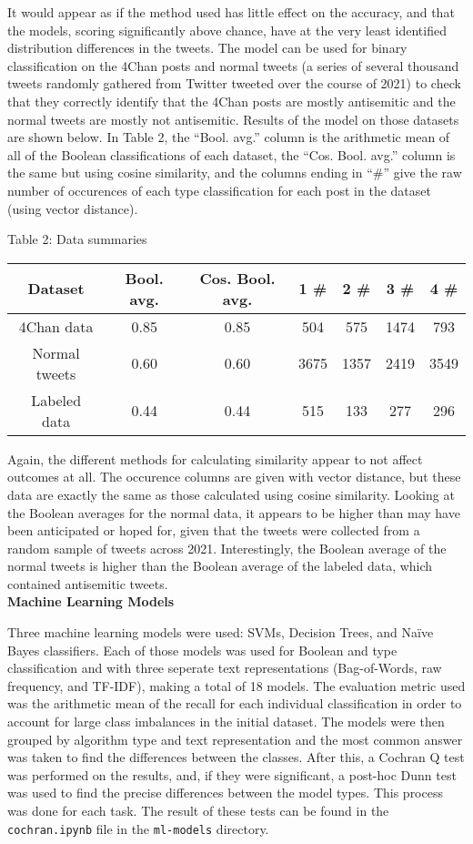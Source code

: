 \documentclass{article}
\begin{document}
It would appear as if the method used has little effect on the accuracy, and that the models, scoring significantly above chance, have at the very least identified distribution differences in the tweets. The model can be used for binary classification on the 4Chan posts and normal tweets (a series of several thousand tweets randomly gathered from Twitter tweeted over the course of 2021) to check that they correctly identify that the 4Chan posts are mostly antisemitic and the normal tweets are mostly not antisemitic. Results of the model on those datasets are shown below. In Table 2, the ``Bool. avg.'' column is the arithmetic mean of all of the Boolean classifications of each dataset, the ``Cos. Bool. avg.'' column is the same but using cosine similarity, and the columns ending in ``\#'' give the raw number of occurences of each type classification for each post in the dataset (using vector distance).
\begin{center}
Table 2: Data summaries\\
\begin{tabular}{ |c|c|c|c|c|c|c|}
\hline {\bf Dataset} & {\bf Bool. avg.} & {\bf Cos. Bool. avg.} & {\bf 1 \#} & {\bf 2 \#} & {\bf 3 \#} & {\bf 4 \#}\\
\hline 4Chan data & 0.85 & 0.85 & 504 & 575 & 1474 & 793\\
\hline Normal tweets & 0.60 & 0.60 & 3675 & 1357 & 2419 & 3549\\
\hline Labeled data & 0.44 & 0.44 & 515 & 133 & 277 & 296\\
\hline
\end{tabular}
\end{center}

Again, the different methods for calculating similarity appear to not affect outcomes at all. The occurence columns are given with vector distance, but these data are exactly the same as those calculated using cosine similarity. Looking at the Boolean averages for the normal data, it appears to be higher than may have been anticipated or hoped for, given that the tweets were collected from a random sample of tweets across 2021. Interestingly, the Boolean average of the normal tweets is higher than the Boolean average of the labeled data, which contained antisemitic tweets.\\

{\bf Machine Learning Models}

Three machine learning models were used: SVMs, Decision Trees, and Naïve Bayes classifiers. Each of those models was used for Boolean and type classification and with three seperate text representations (Bag-of-Words, raw frequency, and TF-IDF), making a total of 18 models. The evaluation metric used was the arithmetic mean of the recall for each individual classification in order to account for large class imbalances in the initial dataset. The models were then grouped by algorithm type and text representation and the most common answer was taken to find the differences between the classes. After this, a Cochran Q test was performed on the results, and, if they were significant, a post-hoc Dunn test was used to find the precise differences between the model types. This process was done for each task. The result of these tests can be found in the \texttt{cochran.ipynb} file in the \texttt{ml-models} directory.
\end{document}
